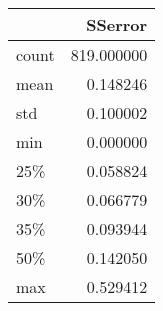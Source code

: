 \begin{tabular}{lr}
\toprule
{} &     SSerror \\
\midrule
count &  819.000000 \\
mean  &    0.148246 \\
std   &    0.100002 \\
min   &    0.000000 \\
25\%   &    0.058824 \\
30\%   &    0.066779 \\
35\%   &    0.093944 \\
50\%   &    0.142050 \\
max   &    0.529412 \\
\bottomrule
\end{tabular}
